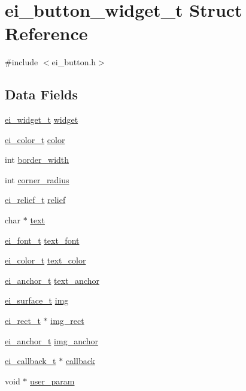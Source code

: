 \hypertarget{structei__button__widget__t}{
\section{ei\_\-button\_\-widget\_\-t Struct Reference}
\label{structei__button__widget__t}
}


{\ttfamily \#include $<$ei\_\-button.h$>$}\subsection*{Data Fields}
\begin{DoxyCompactItemize}
\item 
\hyperlink{structei__widget__t}{ei\_\-widget\_\-t} \hyperlink{structei__button__widget__t_afe19016fcaae2769f18f3b1d73c5579d}{widget}
\item 
\hyperlink{structei__color__t}{ei\_\-color\_\-t} \hyperlink{structei__button__widget__t_a4fda3db8c1feae5c9af783ccda98bdaf}{color}
\item 
int \hyperlink{structei__button__widget__t_aa2ceeafdf9be60f4d5ef5bb58aa20ca7}{border\_\-width}
\item 
int \hyperlink{structei__button__widget__t_a39201d2e78e7d968ba66ceaa34d40f87}{corner\_\-radius}
\item 
\hyperlink{ei__types_8h_aa79a32b1d8ece0e44cfa394e870b270b}{ei\_\-relief\_\-t} \hyperlink{structei__button__widget__t_a347faf83fbd41810b382eba99c7e9e38}{relief}
\item 
char $\ast$ \hyperlink{structei__button__widget__t_a80805109b78e9cf342d2a8c352cfe972}{text}
\item 
\hyperlink{ei__types_8h_a22c8198e4d641e4bc67bb17f9c6bcda7}{ei\_\-font\_\-t} \hyperlink{structei__button__widget__t_ae5e7655fbfdf95430f00a13bfd0bdad4}{text\_\-font}
\item 
\hyperlink{structei__color__t}{ei\_\-color\_\-t} \hyperlink{structei__button__widget__t_a52b3ab3bbf1c0705ef749c34225c074f}{text\_\-color}
\item 
\hyperlink{ei__types_8h_a3852c963af609d31d7cfcff79c4c8450}{ei\_\-anchor\_\-t} \hyperlink{structei__button__widget__t_a19d4c3693b903536fc72dc911e36dc9f}{text\_\-anchor}
\item 
\hyperlink{hw__interface_8h_ad9970ae727c438faaf09c58c5defb796}{ei\_\-surface\_\-t} \hyperlink{structei__button__widget__t_af4b80571568794c12bd89b0c241b6f59}{img}
\item 
\hyperlink{structei__rect__t}{ei\_\-rect\_\-t} $\ast$ \hyperlink{structei__button__widget__t_abee8acda30d36052da02e65b28321389}{img\_\-rect}
\item 
\hyperlink{ei__types_8h_a3852c963af609d31d7cfcff79c4c8450}{ei\_\-anchor\_\-t} \hyperlink{structei__button__widget__t_ad0d7ec24f441b9bec4956f68bd9e2cfe}{img\_\-anchor}
\item 
\hyperlink{ei__widget_8h_a3692fee0affca071917f22f2ec2018a4}{ei\_\-callback\_\-t} $\ast$ \hyperlink{structei__button__widget__t_a74b2646f049211e83783027bd5d2f789}{callback}
\item 
void $\ast$ \hyperlink{structei__button__widget__t_a22fbd9b5b8759b559ac50b85e64c6e4f}{user\_\-param}
\end{DoxyCompactItemize}


